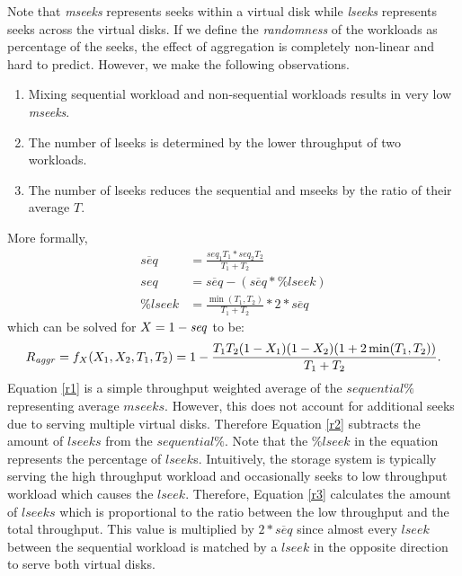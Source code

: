 Note that \emph{mseeks} represents seeks within a virtual disk while \emph{lseeks} represents seeks across the virtual disks.
If we define the \emph{randomness} of the workloads as percentage of the seeks, the effect of aggregation is completely non-linear and hard to predict.
However, we make the following observations.
\begin{enumerate}
\item Mixing sequential workload and non-sequential workloads results in very low \emph{mseeks}.
\item The number of lseeks is determined by the lower throughput of two workloads.
\item The number of lseeks reduces the sequential and mseeks by the ratio of their average $T$.
\end{enumerate}
More formally,
\begin{align}
\overline{seq}&=\frac{\mathit{seq}_1T_1*\mathit{seq}_2T_2}{T_1+T_2}\label{r1}\\
\mathit{seq}&=\overline{seq}-(\overline{seq}*\mathit{\%lseek})\label{r2}\\
\mathit{\%lseek}&=\frac{\min(T_1,T_2)}{T_1+T_2}*2*\overline{seq}\label{r3}
\end{align}
which can be solved for ${X}=1-\mathit{seq}$ to be:
\begin{equation}\label{randFun}
R_{\mathit{aggr}}=f_{X}({X}_1, {X}_2, T_1, T_2)
=1-\frac{T_1T_2(1-{X}_1)(1-{X}_2)(1+2\min(T_1,T_2))}{T_1+T_2}.
\end{equation}
Equation \ref{r1} is a simple throughput weighted average of the $sequential\%$ representing average $mseeks$.
However, this does not account for additional seeks due to serving multiple virtual disks.
Therefore Equation \ref{r2} subtracts the amount of $lseeks$ from the $sequential\%$.
Note that the $\%lseek$ in the equation represents the percentage of $lseek$s.
Intuitively, the storage system is typically serving the high throughput workload and occasionally seeks to low throughput workload which causes the $lseek$.
Therefore, Equation \ref{r3} calculates the amount of $lseeks$ which is proportional to the ratio between the low throughput and the total throughput.
This value is multiplied by $2*\overline{seq}$ since almost every $lseek$ between the sequential workload is matched by a $lseek$ in the opposite direction to serve both virtual disks.

